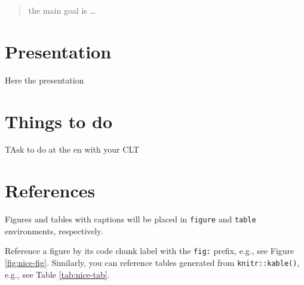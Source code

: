 \documentclass[
]{book}
\begin{document}
\begin{quote}
the main goal is \ldots{}
\end{quote}

\hypertarget{presentation}{%
\section{Presentation}\label{presentation}}

Here the presentation

\hypertarget{things-to-do}{%
\section{Things to do}\label{things-to-do}}

TAsk to do at the en with your CLT

\hypertarget{references}{%
\section{References}\label{references}}

Figures and tables with captions will be placed in \texttt{figure} and \texttt{table} environments, respectively.

Reference a figure by its code chunk label with the \texttt{fig:} prefix, e.g., see Figure \ref{fig:nice-fig}. Similarly, you can reference tables generated from \texttt{knitr::kable()}, e.g., see Table \ref{tab:nice-tab}.
\end{document}
